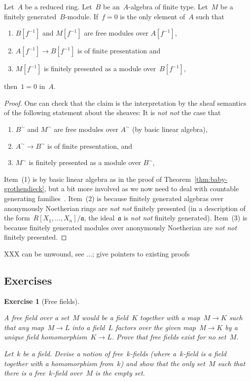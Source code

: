 \documentclass{ws-rv9x6}
\newtheorem{ex}{Exercise}
\newenvironment{exercise}[1]{
  \begin{ex}[#1]
}{\end{ex}}
\newcommand{\aaa}{\mathfrak{a}}
\renewcommand{\_}{\mathpunct{.}}
\newcommand{\?}{\,{:}\,}
\newcommand{\notnot}{\emph{not not}\xspace}
\begin{document}
\begin{theorem}
Let~$A$ be a reduced ring. Let~$B$ be an~$A$-algebra of finite type. Let~$M$ be
a finitely generated~$B$-module.
If~$f = 0$ is the only element of~$A$ such that
\begin{enumerate}
\item $B[f^{-1}]$ and $M[f^{-1}]$ are free modules over $A[f^{-1}]$,
\item $A[f^{-1}] \to B[f^{-1}]$ is of finite presentation and
\item $M[f^{-1}]$ is finitely presented as a module over~$B[f^{-1}]$,
\end{enumerate}
then~$1 = 0$ in~$A$.
\end{theorem}

\begin{proof}One can check that the claim is the interpretation by the sheaf
semantics of the following statement about the sheaves: It is \notnot the case that
\begin{enumerate}
  \item $B^\sim$ and $M^\sim$ are free modules over $A^\sim$ (by basic linear algebra),
  \item $A^\sim \to B^\sim$ is of finite presentation, and
  \item $M^\sim$ is finitely presented as a module over $B^\sim$,
\end{enumerate}

Item~(1) is by basic linear algebra as in the proof of
Theorem~\ref{thm:baby-grothendieck}, but a bit more involved as we now need to
deal with countable generating
families~\cite[Theorem~11.16]{blechschmidt:phd}. Item~(2) is because finitely
generated algebras over anonymously Noetherian rings are \notnot finitely
presented (in a description of the form~$R[X_1,\ldots,X_n]/\aaa$, the
ideal~$\aaa$ is \notnot finitely generated).
Item~(3) is because finitely generated modules over anonymously Noetherian are
\notnot finitely presented.
\end{proof}

XXX can be unwound, see ...; give pointers to existing proofs


\subsection{Exercises}

\begin{exercise}{Free fields}
\begin{alphlist}[(b)]
\item A \emph{free field} over a set~$M$ would be
a field~$K$ together with a map~$M \to K$ such that any map~$M \to L$ into a
field~$L$ factors
over the given map~$M \to K$ by a unique field homomorphism~$K \to L$. Prove
that free fields exist for no set~$M$.
\item Let~$k$ be a field. Devise a notion of
\emph{free~$k$-fields} (where a~$k$-field is a field together with a
homomorphism from~$k$) and show that the only set~$M$ such that there is a
free~$k$-field over~$M$ is the empty set.
\end{alphlist}
\end{exercise}
\end{document}
